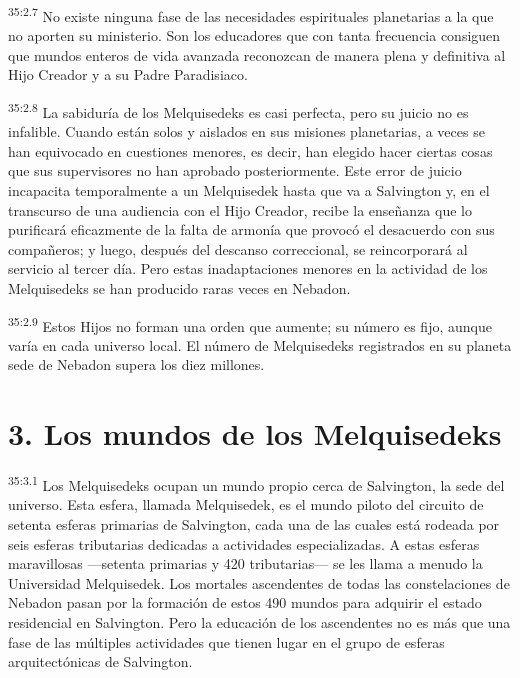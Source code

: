 \par
\textsuperscript{35:2.7} No existe ninguna fase de las necesidades espirituales planetarias a la que no aporten su ministerio. Son los educadores que con tanta frecuencia consiguen que mundos enteros de vida avanzada reconozcan de manera plena y definitiva al Hijo Creador y a su Padre Paradisiaco.

\par
\textsuperscript{35:2.8} La sabiduría de los Melquisedeks es casi perfecta, pero su juicio no es infalible. Cuando están solos y aislados en sus misiones planetarias, a veces se han equivocado en cuestiones menores, es decir, han elegido hacer ciertas cosas que sus supervisores no han aprobado posteriormente. Este error de juicio incapacita temporalmente a un Melquisedek hasta que va a Salvington y, en el transcurso de una audiencia con el Hijo Creador, recibe la enseñanza que lo purificará eficazmente de la falta de armonía que provocó el desacuerdo con sus compañeros; y luego, después del descanso correccional, se reincorporará al servicio al tercer día. Pero estas inadaptaciones menores en la actividad de los Melquisedeks se han producido raras veces en Nebadon.

\par
\textsuperscript{35:2.9} Estos Hijos no forman una orden que aumente; su número es fijo, aunque varía en cada universo local. El número de Melquisedeks registrados en su planeta sede de Nebadon supera los diez millones.

\section*{3. Los mundos de los Melquisedeks}
\par
\textsuperscript{35:3.1} Los Melquisedeks ocupan un mundo propio cerca de Salvington, la sede del universo. Esta esfera, llamada Melquisedek, es el mundo piloto del circuito de setenta esferas primarias de Salvington, cada una de las cuales está rodeada por seis esferas tributarias dedicadas a actividades especializadas. A estas esferas maravillosas ---setenta primarias y 420 tributarias--- se les llama a menudo la Universidad Melquisedek. Los mortales ascendentes de todas las constelaciones de Nebadon pasan por la formación de estos 490 mundos para adquirir el estado residencial en Salvington. Pero la educación de los ascendentes no es más que una fase de las múltiples actividades que tienen lugar en el grupo de esferas arquitectónicas de Salvington.

